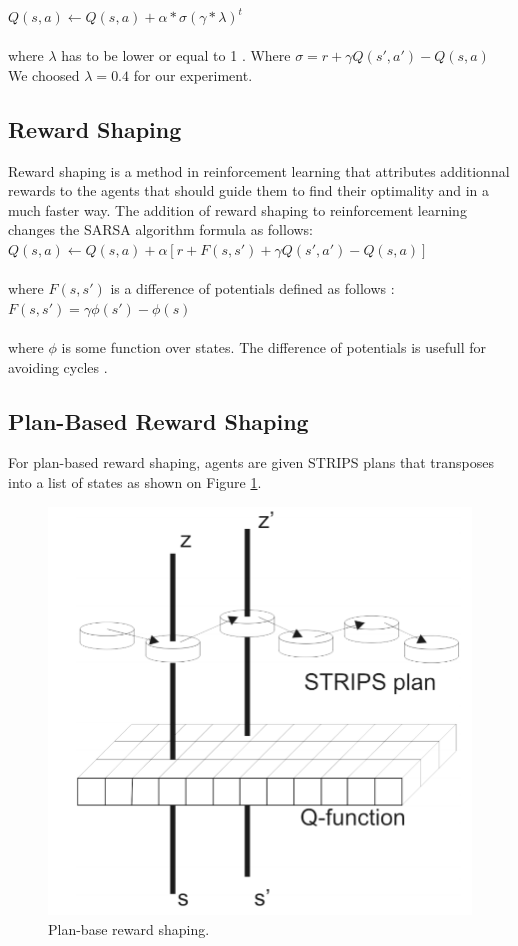 \documentclass[letterpaper]{article}
\begin{document}
$Q(s, a) \leftarrow  Q(s, a) +  \alpha *  \sigma (\gamma * \lambda)^t$\\\\
where $\lambda$ has to be lower or equal to 1 \citep{etrace}. Where $ \sigma = r + \gamma Q(s', a') - Q(s,a)$ We choosed  $\lambda = 0.4$ for our experiment.

\subsection{Reward Shaping}

Reward shaping is a method in reinforcement learning that attributes additionnal rewards to the agents that should guide them to find their optimality and in a much faster way.
The addition of reward shaping to reinforcement learning changes the SARSA algorithm formula as follows: \\

$Q(s, a) \leftarrow  Q(s, a) +  \alpha [r + F(s, s') + \gamma Q(s', a') - Q(s,a)]$\\\\
where $ F(s, s')$  is a difference of potentials defined as follows : \\

$F(s, s') =\gamma \phi (s') - \phi (s)$\\\\
where $\phi$ is some function over states. The difference of potentials is usefull for avoiding cycles  \citep{rs2}.

\subsection{Plan-Based Reward Shaping}

For plan-based reward shaping, agents are given STRIPS plans that transposes into a list of states as shown on  Figure \ref{fig:strips}.

\begin{figure}[h!]
\centering
  \includegraphics[width=0.75\linewidth]{img/strips.png}
  \caption{Plan-base reward shaping.}
  \label{fig:strips}
\end{figure}
\end{document}
